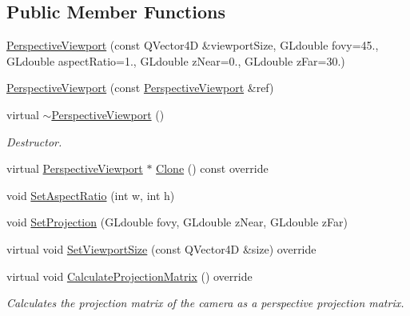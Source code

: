 \subsection*{Public Member Functions}
\begin{DoxyCompactItemize}
\item 
\mbox{\hyperlink{class_geometry_engine_1_1_geometry_item_utils_1_1_perspective_viewport_af8f86542b7ad6a8b91a3d659d3d2f933}{Perspective\+Viewport}} (const Q\+Vector4D \&viewport\+Size, G\+Ldouble fovy=45., G\+Ldouble aspect\+Ratio=1., G\+Ldouble z\+Near=0., G\+Ldouble z\+Far=30.)
\item 
\mbox{\hyperlink{class_geometry_engine_1_1_geometry_item_utils_1_1_perspective_viewport_a9d671fa5666d470b23369b11e4dbc298}{Perspective\+Viewport}} (const \mbox{\hyperlink{class_geometry_engine_1_1_geometry_item_utils_1_1_perspective_viewport}{Perspective\+Viewport}} \&ref)
\item 
\mbox{\label{class_geometry_engine_1_1_geometry_item_utils_1_1_perspective_viewport_a27caa3ea6db0242b1737f4d4a402b3fb}} 
virtual \mbox{\hyperlink{class_geometry_engine_1_1_geometry_item_utils_1_1_perspective_viewport_a27caa3ea6db0242b1737f4d4a402b3fb}{$\sim$\+Perspective\+Viewport}} ()
\begin{DoxyCompactList}\small\item\em Destructor. \end{DoxyCompactList}\item 
virtual \mbox{\hyperlink{class_geometry_engine_1_1_geometry_item_utils_1_1_perspective_viewport}{Perspective\+Viewport}} $\ast$ \mbox{\hyperlink{class_geometry_engine_1_1_geometry_item_utils_1_1_perspective_viewport_a828a22e5d39e7c8d1812e97f582bf667}{Clone}} () const override
\item 
void \mbox{\hyperlink{class_geometry_engine_1_1_geometry_item_utils_1_1_perspective_viewport_a916b7090b29f070efe8ca4b91e818182}{Set\+Aspect\+Ratio}} (int w, int h)
\item 
void \mbox{\hyperlink{class_geometry_engine_1_1_geometry_item_utils_1_1_perspective_viewport_ad53e3996cca001300427d04eb340bdee}{Set\+Projection}} (G\+Ldouble fovy, G\+Ldouble z\+Near, G\+Ldouble z\+Far)
\item 
virtual void \mbox{\hyperlink{class_geometry_engine_1_1_geometry_item_utils_1_1_perspective_viewport_a01764cc11407ed9ce70111a627c823ae}{Set\+Viewport\+Size}} (const Q\+Vector4D \&size) override
\item 
\mbox{\label{class_geometry_engine_1_1_geometry_item_utils_1_1_perspective_viewport_aeb08a0d3ef705c46c314f30fc562adeb}} 
virtual void \mbox{\hyperlink{class_geometry_engine_1_1_geometry_item_utils_1_1_perspective_viewport_aeb08a0d3ef705c46c314f30fc562adeb}{Calculate\+Projection\+Matrix}} () override
\begin{DoxyCompactList}\small\item\em Calculates the projection matrix of the camera as a perspective projection matrix. \end{DoxyCompactList}\end{DoxyCompactItemize}
